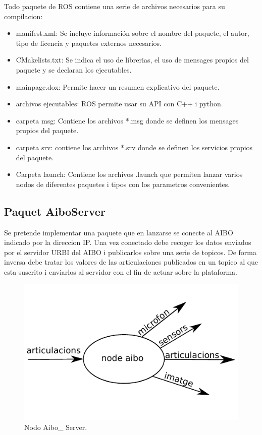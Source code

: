 \documentclass[12pt,a4paper,final,twoside]{article}
\begin{document}
Todo paquete de ROS contiene una serie de archivos necesarios para su compilacion:
\begin{itemize}
\item manifest.xml: Se incluye información sobre el nombre del paquete, el autor, tipo de licencia y paquetes externos necesarios.
\item CMakelists.txt: Se indica el uso de librerias, el uso de mensages propios del paquete y se declaran los ejecutables.
\item mainpage.dox: Permite hacer un resumen explicativo del paquete.
\item archivos ejecutables: ROS permite usar su API con C++ i python.
\item carpeta msg: Contiene los archivos *.msg donde se definen los mensages propios del paquete.
\item carpeta srv: contiene los archivos *.srv donde se definen los servicios propios del paquete.
\item Carpeta launch: Contiene los archivos .launch que permiten lanzar varios nodos de diferentes paquetes i tipos con los parametros convenientes.

\end{itemize}
\subsection{Paquet AiboServer }
Se pretende implementar una paquete que en lanzarse se conecte al AIBO indicado por la direccion IP. Una vez conectado debe recoger los datos enviados por el servidor URBI del AIBO i publicarlos sobre una serie de topicos. De forma inversa debe tratar los valores de las articulaciones publicados en un topico al que esta suscrito i enviarlos al servidor con el fin de actuar sobre la plataforma.

\begin{figure}[H]
	\centering
    \includegraphics[scale=1]{images/aiboserver.pdf}
	 \caption{Nodo Aibo\_ Server.}
  \label{fig:aiboserv}
\end{figure}
\end{document}
